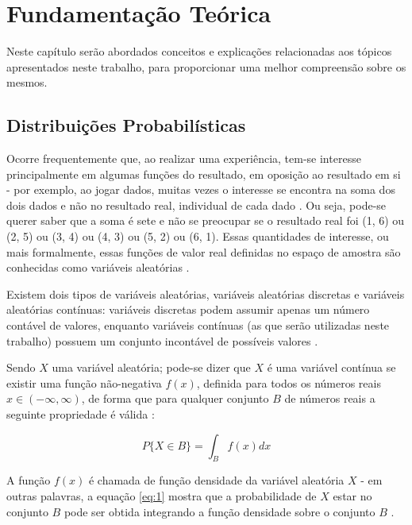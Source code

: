 \setlength\abovedisplayskip{0pt} \setlength\belowdisplayskip{0pt}
\setlength\abovedisplayshortskip{0pt} \setlength\belowdisplayshortskip{0pt}

\chapter{Fundamentação Teórica} \label{cap:fundamentacao}
Neste capítulo serão abordados conceitos e explicações relacionadas aos tópicos apresentados neste trabalho, para proporcionar uma melhor compreensão sobre os mesmos.

\section{Distribuições Probabilísticas}

Ocorre frequentemente que, ao realizar uma experiência, tem-se interesse principalmente em algumas funções do resultado, em oposição ao resultado em si - por exemplo, ao jogar dados, muitas vezes o interesse se encontra na soma dos dois dados e não no resultado real, individual de cada dado \cite{ross}. Ou seja, pode-se querer saber que a soma é sete e não se preocupar se o resultado real foi (1, 6) ou (2, 5) ou (3, 4) ou (4, 3) ou (5, 2) ou (6, 1). Essas quantidades de interesse, ou mais formalmente, essas funções de valor real definidas no espaço de amostra são conhecidas como variáveis aleatórias \cite{ross}.

Existem dois tipos de variáveis aleatórias, variáveis aleatórias discretas e variáveis aleatórias contínuas: variáveis discretas podem assumir apenas um número contável de valores, enquanto variáveis contínuas (as que serão utilizadas neste trabalho) possuem um conjunto incontável de possíveis valores \cite{ross}.

Sendo $X$ uma variável aleatória; pode-se dizer que $X$ é uma variável contínua se existir uma função não-negativa $f(x)$, definida para todos os números reais $x \in (-\infty, \infty)$, de forma que para qualquer conjunto $B$ de números reais a seguinte propriedade é válida \cite{ross}:

\begin{equation}
\label{eq:1}
    P\{X \in B\} = \int_{B} f(x) dx
\end{equation}

A função $f(x)$ é chamada de função densidade da variável aleatória $X$ - em outras palavras, a equação \ref{eq:1} mostra que a probabilidade de $X$ estar no conjunto $B$ pode ser obtida integrando a função densidade sobre o conjunto $B$ \cite{ross}.

